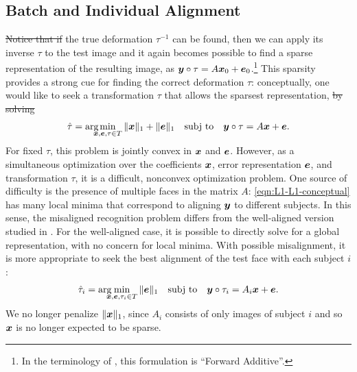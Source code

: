 \documentclass[12pt,journal,draftcls,letterpaper,onecolumn]{IEEEtran}
\newcommand{\subj}{\textup{subj to}}
\providecommand{\DIFadd}[1]{{\protect\color{blue}\uwave{#1}}} %
\providecommand{\DIFdel}[1]{{\protect\color{red}\sout{#1}}}                      %
\providecommand{\DIFaddbegin}{} %
\providecommand{\DIFaddend}{} %
\providecommand{\DIFdelbegin}{} %
\providecommand{\DIFdelend}{} %
\begin{document}
\subsection{Batch and Individual Alignment} \DIFdelbegin \DIFdel{Notice that if }\DIFdelend \DIFaddbegin \DIFadd{If }\DIFaddend the
true deformation $\tau^{-1}$ can be found, then we can apply
its inverse $\tau$ to the test image and it again becomes
possible to find a sparse representation of the resulting
image, as ${\boldsymbol{y}} \circ \tau = A {\boldsymbol{x}}_0 + \boldsymbol{e}_0$.\footnote{In the terminology of \cite{baker2004lucas}, this formulation is ``Forward Additive''.}
  This sparsity
provides a strong cue for finding the correct deformation
$\tau$: conceptually, one would like to seek a transformation
$\tau$ that allows the sparsest representation, \DIFdelbegin \DIFdel{by solving
}\DIFdelend \DIFaddbegin \DIFadd{via
}\DIFaddend \begin{equation} \label{eqn:L1-L1-conceptual}
\hat{\tau} = \arg\hspace{-2.5mm}\min_{\x,\e,\tau \in T} \| \x \|_1 + \| \e \|_1 \quad \subj \quad \y \circ \tau = A \x + \e.
\end{equation}
For fixed $\tau$, this problem is jointly convex in ${\boldsymbol{x}}$ and
$\boldsymbol{e}$. However, as a simultaneous optimization over the
coefficients ${\boldsymbol{x}}$, error representation $\boldsymbol{e}$, and
transformation $\tau$, it is a difficult, nonconvex
optimization problem. One source of difficulty is the presence
of multiple faces in the matrix $A$:
\eqref{eqn:L1-L1-conceptual} has many local minima that
correspond to aligning ${\boldsymbol{y}}$ to different subjects. In this
sense, the misaligned recognition problem differs from the
well-aligned version studied in \cite{Wright2009-PAMI}. For the
well-aligned case, it is possible to directly solve for a
global representation, with no concern for local minima. With
possible misalignment, it is more appropriate to seek the best
alignment of the test face with each subject $i$:
\begin{equation} \label{eqn:per-subject-L1}
\hat \tau_i = \arg\hspace{-2.5mm}\min_{\x,\e,\tau_i \in T} \| \e \|_1 \quad \subj \quad \y \circ \tau_i = A_i \x + \e.
\end{equation}
We no longer penalize $\| {\boldsymbol{x}} \|_1$, since $A_i$ consists of
only images of subject $i$ and so ${\boldsymbol{x}}$ is no longer expected to
be sparse.
\end{document}
